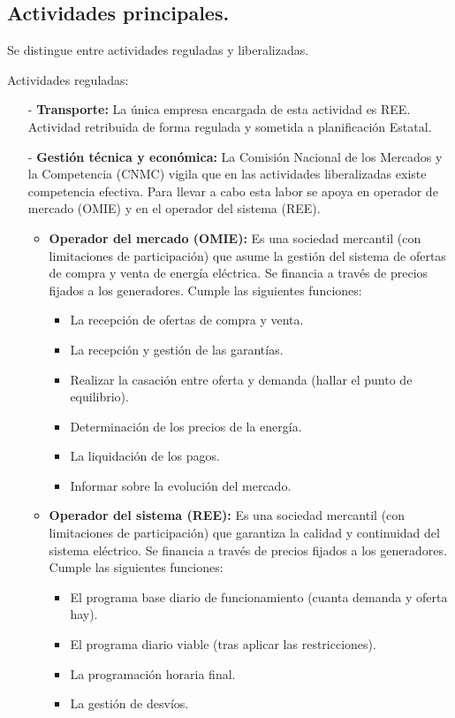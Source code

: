 \subsection{Actividades principales.}
Se distingue entre actividades reguladas y liberalizadas.


Actividades reguladas:
\begin{itemize}
	\item [-] \textbf{Transporte:} La única empresa encargada de esta actividad es REE. Actividad retribuida de forma regulada y sometida a planificación Estatal.
	\item [-] \textbf{Gestión técnica y económica:} La Comisión Nacional de los Mercados y la Competencia (CNMC) vigila que en las actividades liberalizadas existe competencia efectiva. Para llevar a cabo esta labor se apoya en operador de mercado (OMIE) y en el operador del sistema (REE).
	\begin{itemize}
		\item \textbf{Operador del mercado (OMIE):} Es una sociedad mercantil (con limitaciones de participación) que asume la gestión del sistema de ofertas de compra y venta de energía eléctrica. Se financia a través de precios fijados a los generadores. Cumple las siguientes funciones:
		\begin{itemize}
			\item La recepción de ofertas de compra y venta.
			\item La recepción y gestión de las garantías.
			\item Realizar la casación entre oferta y demanda (hallar el punto de equilibrio).
			\item Determinación de los precios de la energía.
			\item La liquidación de los pagos.
			\item Informar sobre la evolución del mercado.
		\end{itemize}
		\item \textbf{Operador del sistema (REE):} Es una sociedad mercantil (con limitaciones de participación) que garantiza la calidad y continuidad del sistema eléctrico. Se financia a través de precios fijados a los generadores. Cumple las siguientes funciones:
		\begin{itemize}
			\item El programa base diario de funcionamiento (cuanta demanda y oferta hay).
			\item El programa diario viable (tras aplicar las restricciones).
			\item La programación horaria final.
			\item La gestión de desvíos.
		\end{itemize}
	\end{itemize}
\end{itemize}


